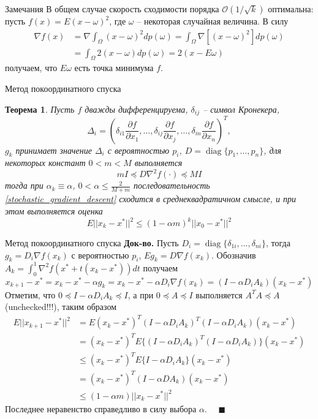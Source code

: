 \documentclass[10pt, handout]{beamer}
\DeclareMathOperator{\diag}{diag}
\newcounter{thm}
\newtheorem{theorem_ru}[thm]{Теорема}
\begin{document}
\begin{frame}{Замечания}
В общем случае скорость сходимости порядка $\mathcal{O}(1/\sqrt{k})$ оптимальна: пусть $f(x)=E(x-\omega)^2$, где $\omega$ -- некоторая случайная величина.
В силу 
\begin{align*}
\nabla f(x)&=\nabla \int_\Omega(x-\omega)^2dp(\omega)=\int_\Omega\nabla[(x-\omega)^2]dp(\omega)\\
&=\int_\Omega 2(x-\omega)dp(\omega)=2(x-E\omega)
\end{align*}
получаем, что $E\omega$ есть точка минимума $f$.
\end{frame}

\begin{frame}{Метод покоординатного спуска}
\begin{theorem_ru}
Пусть $f$ дважды дифференцируема, $\delta_{ij}$ -- символ Кронекера,
$$
\Delta_i=\left(\delta_{i1}\frac{\partial f}{\partial x_1}, \ldots, \delta_{ij}\frac{\partial f}{\partial x_j}, \dots, 
\delta_{in}\frac{\partial f}{\partial x_n}\right)^T,
$$
$g_k$ принимает значение $\Delta_i$ с вероятностью $p_i$, $D=\diag\{p_1, \ldots, p_n\}$, для некоторых констант $0<m<M$ выполняется
$$
mI\preceq D\nabla^2 f(\cdot)\preceq MI
$$
тогда при $\alpha_k\equiv \alpha$, $0<\alpha\leq \frac{2}{M+m}$ последовательность \eqref{stochastic_gradient_descent} сходится в среднеквадратичном смысле, и при этом выполняется оценка
$$
E||x_k-x^*||^2\leq \left(1-\alpha m\right)^k||x_0-x^*||^2
$$
\end{theorem_ru}
\end{frame}

\begin{frame}{Метод покоординатного спуска}
\textbf{Док-во.} Пусть $D_i=\diag\{\delta_{1i}, \ldots, \delta_{ni}\}$, тогда $g_k=D_i\nabla f(x_k)$ с вероятностью $p_i$, $Eg_k=D\nabla f(x_k)$. 
Обозначив $A_k=\int_0^1\nabla^2f(x^*+t(x_k-x^*))dt$ получаем
$$
x_{k+1}-x^*=x_k-x^*-\alpha g_k=x_k-x^*-\alpha D_i\nabla f(x_k)=(I-\alpha D_i A_k)(x_k-x^*)
$$
\pause
Отметим, что $0\preceq I-\alpha D_i A_k\preceq I$, а при $0\preceq A\preceq I$ выполняется $A^TA\preceq A$ (unchecked!!!), таким образом
\begin{align*}
E||x_{k+1}-x^*||^2&=E(x_k-x^*)^T(I-\alpha D_i A_k)^T(I-\alpha D_i A_k)(x_k-x^*)\\
&= (x_k-x^*)^TE\{(I-\alpha D_i A_k)^T(I-\alpha D_i A_k)\}(x_k-x^*)\\
&\leq (x_k-x^*)^T E\{I-\alpha D_i A_k\}(x_k-x^*)\\
&= (x_k-x^*)^T (I-\alpha D A_k)(x_k-x^*)\\
&\leq (1-\alpha m)||x_k-x^*||^2
\end{align*}
Последнее неравенство справедливо в силу выбора $\alpha$. ~~$\blacksquare$
\end{frame}
\end{document}
